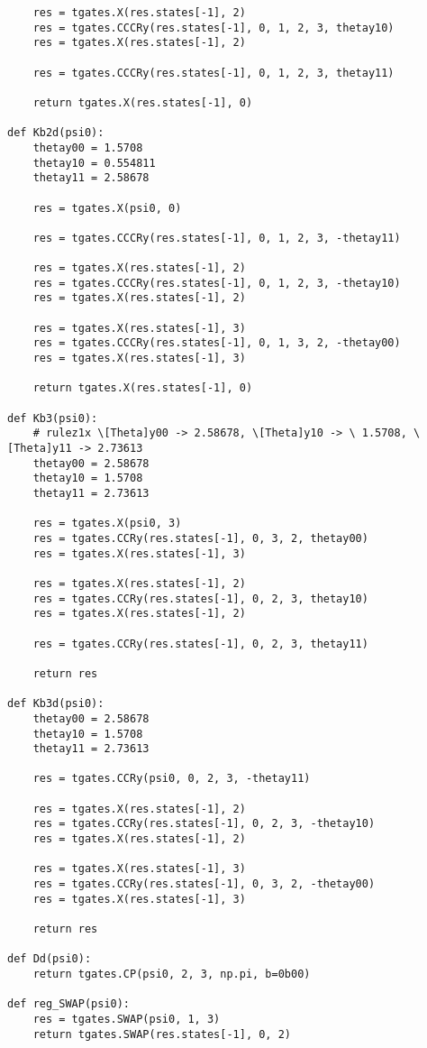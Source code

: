 \begin{verbatim}
    res = tgates.X(res.states[-1], 2)
    res = tgates.CCCRy(res.states[-1], 0, 1, 2, 3, thetay10)
    res = tgates.X(res.states[-1], 2)

    res = tgates.CCCRy(res.states[-1], 0, 1, 2, 3, thetay11)

    return tgates.X(res.states[-1], 0)

def Kb2d(psi0):
    thetay00 = 1.5708
    thetay10 = 0.554811
    thetay11 = 2.58678

    res = tgates.X(psi0, 0)

    res = tgates.CCCRy(res.states[-1], 0, 1, 2, 3, -thetay11)

    res = tgates.X(res.states[-1], 2)
    res = tgates.CCCRy(res.states[-1], 0, 1, 2, 3, -thetay10)
    res = tgates.X(res.states[-1], 2)

    res = tgates.X(res.states[-1], 3)
    res = tgates.CCCRy(res.states[-1], 0, 1, 3, 2, -thetay00)
    res = tgates.X(res.states[-1], 3)

    return tgates.X(res.states[-1], 0)

def Kb3(psi0):
    # rulez1x \[Theta]y00 -> 2.58678, \[Theta]y10 -> \ 1.5708, \[Theta]y11 -> 2.73613
    thetay00 = 2.58678
    thetay10 = 1.5708
    thetay11 = 2.73613

    res = tgates.X(psi0, 3)
    res = tgates.CCRy(res.states[-1], 0, 3, 2, thetay00)
    res = tgates.X(res.states[-1], 3)

    res = tgates.X(res.states[-1], 2)
    res = tgates.CCRy(res.states[-1], 0, 2, 3, thetay10)
    res = tgates.X(res.states[-1], 2)

    res = tgates.CCRy(res.states[-1], 0, 2, 3, thetay11)

    return res

def Kb3d(psi0):
    thetay00 = 2.58678
    thetay10 = 1.5708
    thetay11 = 2.73613

    res = tgates.CCRy(psi0, 0, 2, 3, -thetay11)

    res = tgates.X(res.states[-1], 2)
    res = tgates.CCRy(res.states[-1], 0, 2, 3, -thetay10)
    res = tgates.X(res.states[-1], 2)

    res = tgates.X(res.states[-1], 3)
    res = tgates.CCRy(res.states[-1], 0, 3, 2, -thetay00)
    res = tgates.X(res.states[-1], 3)

    return res

def Dd(psi0):
    return tgates.CP(psi0, 2, 3, np.pi, b=0b00)

def reg_SWAP(psi0):
    res = tgates.SWAP(psi0, 1, 3)
    return tgates.SWAP(res.states[-1], 0, 2)



\end{verbatim}
